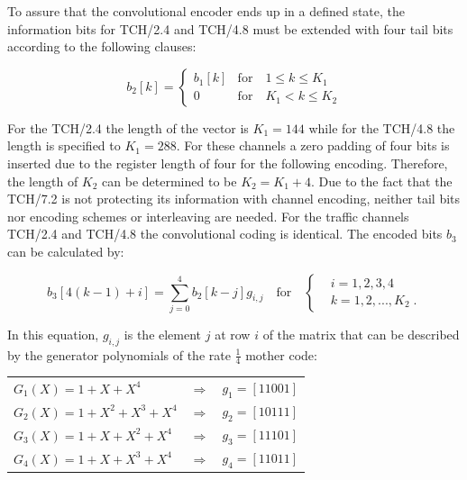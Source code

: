 To assure that the convolutional encoder ends up in a defined state, the information bits for TCH/2.4 and TCH/4.8 must be extended with four tail bits according to the following clauses:

\begin{equation}
 b_2[k]= 
\begin{cases}
	b_1[k] & \text{for} \quad 1 \leq k \leq K_1 \\
	0			 & \text{for} \quad K_1 < k \leq K_2
	\end{cases}
\end{equation}

For the TCH/2.4 the length of the vector is $K_1=144$ while for the TCH/4.8 the length is specified to $K_1=288$. For these channels a zero padding of four bits is inserted due to the register length of four for the following encoding. Therefore, the length of $K_2$ can be determined to be $K_2 = K_1+4$. Due to the fact that the  TCH/7.2 is not protecting its information with channel encoding, neither tail bits nor encoding schemes or interleaving are needed. For the traffic channels TCH/2.4 and TCH/4.8 the convolutional coding is identical. The encoded bits $b_3$ can be calculated by:

\begin{equation}
 b_3[4(k-1)+i]=\sum_{j=0}^{4} b_2[k-j]g_{i,j} \quad \text{for} \quad 
\begin{cases}
             &i=1, 2, 3, 4    \\
             &k=1, 2,..., K_2 \; .
 \end{cases}
\end{equation}

In this equation, $g_{i,j}$ is the element $j$ at row $i$ of the matrix that can be described by the generator polynomials of the rate $\frac{1}{4}$ mother code:

\begin{table}[!!ht]
	\centering\begin{tabular}{lcl}
		$G_1(X)=1+X+X^4$		&$\Rightarrow$	&$g_1=[1 1 0 0 1]$\\
		$G_2(X)=1+X^2+X^3+X^4$	&$\Rightarrow$	&$g_2=[1 0 1 1 1]$\\
		$G_3(X)=1+X+X^2+X^4$	&$\Rightarrow$	&$g_3=[1 1 1 0 1]$\\
		$G_4(X)=1+X+X^3+X^4$	&$\Rightarrow$	&$g_4=[1 1 0 1 1]$\\
	\end{tabular}\\
\end{table}


